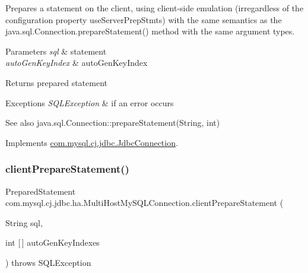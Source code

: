 Prepares a statement on the client, using client-\/side emulation (irregardless of the configuration property \textquotesingle{}use\+Server\+Prep\+Stmts\textquotesingle{}) with the same semantics as the java.\+sql.\+Connection.\+prepare\+Statement() method with the same argument types.


\begin{DoxyParams}{Parameters}
{\em sql} & statement \\
\hline
{\em auto\+Gen\+Key\+Index} & auto\+Gen\+Key\+Index \\
\hline
\end{DoxyParams}
\begin{DoxyReturn}{Returns}
prepared statement 
\end{DoxyReturn}

\begin{DoxyExceptions}{Exceptions}
{\em S\+Q\+L\+Exception} & if an error occurs \\
\hline
\end{DoxyExceptions}
\begin{DoxySeeAlso}{See also}
java.\+sql.\+Connection\+::prepare\+Statement(\+String, int) 
\end{DoxySeeAlso}


Implements \mbox{\hyperlink{interfacecom_1_1mysql_1_1cj_1_1jdbc_1_1_jdbc_connection_a1d01e4f2fd60084794906cc9a1c24c24}{com.\+mysql.\+cj.\+jdbc.\+Jdbc\+Connection}}.

\mbox{\label{classcom_1_1mysql_1_1cj_1_1jdbc_1_1ha_1_1_multi_host_my_s_q_l_connection_ac3338beff85b1b1704e87f67b643eeaa}} 
\subsubsection{\texorpdfstring{client\+Prepare\+Statement()}{clientPrepareStatement()}\hspace{0.1cm}{\footnotesize\ttfamily [4/6]}}
{\footnotesize\ttfamily Prepared\+Statement com.\+mysql.\+cj.\+jdbc.\+ha.\+Multi\+Host\+My\+S\+Q\+L\+Connection.\+client\+Prepare\+Statement (\begin{DoxyParamCaption}\item[{String}]{sql,  }\item[{int \mbox{[}$\,$\mbox{]}}]{auto\+Gen\+Key\+Indexes }\end{DoxyParamCaption}) throws S\+Q\+L\+Exception}

